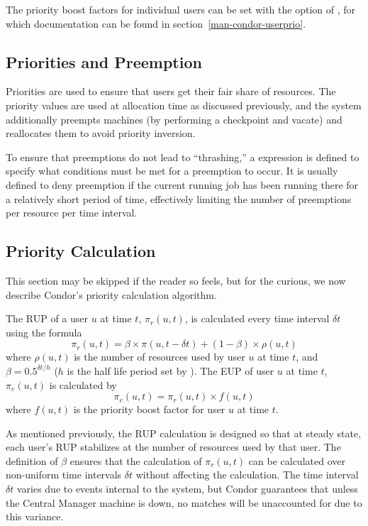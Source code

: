 The priority boost factors for individual users can be set with the 
 option of , for which documentation can
be found in section~\ref{man-condor-userprio}.

\subsection{Priorities and Preemption}
Priorities are used to ensure that users get their fair share of resources.  
The priority values are used at allocation time as discussed previously, and
the system additionally preempts machines (by performing a checkpoint and
vacate) and reallocates them to avoid priority inversion.

To ensure that preemptions do not lead to ``thrashing,'' a 
 expression is defined to specify what
conditions must be met for a preemption to occur.
It is usually defined to deny preemption if the current running job
has been running there for a relatively short period of time,
effectively limiting the number of preemptions per resource per time
interval.

\subsection{Priority Calculation}
This section may be skipped if the reader so feels, but for the curious,
we now describe Condor's priority calculation algorithm.

The RUP of a user $u$ at time $t$, $\pi_r(u,t)$, is calculated 
every time interval $\delta t$ using the formula 
$$\pi_r(u,t) = \beta\times\pi(u,t-\delta t) + (1-\beta)\times\rho(u,t)$$
where $\rho(u,t)$ is the number of resources used by user $u$ at time $t$,
and $\beta=0.5^{{\delta t}/h}$ ($h$ is the half life period set by 
).  The EUP of user $u$ at time $t$, $\pi_e(u,t)$
is calculated by
$$\pi_e(u,t) = \pi_r(u,t)\times f(u,t)$$
where $f(u,t)$ is the priority boost factor for user $u$ at time $t$.

As mentioned previously, the RUP calculation is designed so that at steady
state, each user's RUP stabilizes at the number of resources used by that user. 
The definition of $\beta$ ensures that the calculation of $\pi_r(u,t)$ can be 
calculated over non-uniform time intervals $\delta t$ without affecting the 
calculation.  The time interval $\delta t$ varies due to events internal to 
the system, but Condor guarantees that unless the Central Manager machine is 
down, no matches will be unaccounted for due to this variance.
